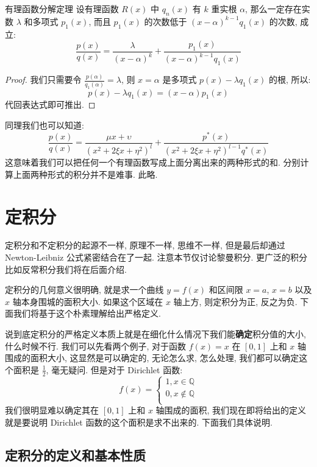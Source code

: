 \documentclass[a4paper,12pt]{ctexart}
\begin{document}
\begin{mythm}{有理函数分解定理}{}
设有理函数 $R(x)$ 中 $q_n(x)$ 有 $k$ 重实根 $\alpha$, 那么一定存在实数 $\lambda$ 和多项式 $p_1(x)$, 而且 $p_1(x)$ 的次数低于 $(x-\alpha)^{k-1} q_1(x)$ 的次数, 成立:
$$
\frac{p(x)}{q(x)} = \frac{\lambda}{(x-\alpha)^k}+\frac{p_1(x)}{(x-\alpha)^{k-1} q_1(x)}
$$
\end{mythm}

\begin{proof}
我们只需要令 $\frac{p(\alpha)}{q_1(\alpha)} = \lambda$, 则 $x=\alpha$ 是多项式 $p(x)-\lambda q_1(x)$ 的根, 所以:
$$
p(x)-\lambda q_1(x) = (x-\alpha)p_1(x)
$$
代回表达式即可推出.
\end{proof}

同理我们也可以知道:
$$
\frac{p(x)}{q(x)} = \frac{\mu x + \upsilon}{(x^2+2\xi x + \eta^2)^l}+\frac{p^*(x)}{(x^2+2\xi x + \eta^2)^{l-1} q^*(x)}
$$
这意味着我们可以把任何一个有理函数写成上面分离出来的两种形式的和. 分别计算上面两种形式的积分并不是难事. 此略.

\section{定积分}

定积分和不定积分的起源不一样, 原理不一样, 思维不一样, 但是最后却通过 Newton-Leibniz 公式紧密结合在了一起. 注意本节仅讨论黎曼积分. 更广泛的积分比如反常积分我们将在后面介绍.

定积分的几何意义很明确, 就是求一个曲线 $y=f(x)$ 和区间限 $x=a$, $x=b$ 以及 $x$ 轴本身围城的面积大小. 如果这个区域在 $x$ 轴上方, 则定积分为正, 反之为负. 下面我们将基于这个朴素理解给出严格定义.

说到底定积分的严格定义本质上就是在细化什么情况下我们能\textbf{确定}积分值的大小, 什么时候不行. 我们可以先看两个例子, 对于函数 $f(x)=x$ 在 $[0,1]$ 上和 $x$ 轴围成的面积大小, 这显然是可以确定的, 无论怎么求, 怎么处理, 我们都可以确定这个面积是 $\frac{1}{2}$, 毫无疑问. 但是对于 Dirichlet 函数:
$$
f(x) =
\begin{cases}
    1, x\in \mathbb{Q} \\
    0, x\notin \mathbb{Q}\\
\end{cases}
$$
我们很明显难以确定其在 $[0,1]$ 上和 $x$ 轴围成的面积, 我们现在即将给出的定义就是要说明 Dirichlet 函数的这个面积是求不出来的. 下面我们具体说明.

\subsection{定积分的定义和基本性质}
\end{document}
